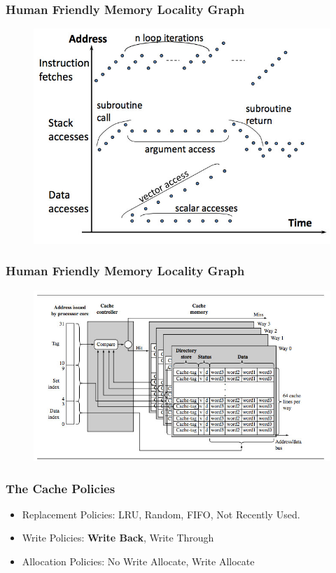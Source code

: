 \documentclass{beamer}
\begin{document}

\begin{frame}[plain]
	\frametitle{Human Friendly Memory Locality Graph}
		\begin{figure}
			\includegraphics[width=0.9\linewidth]{img/localitygraph2.jpg}
		\end{figure}
\end{frame}


\begin{frame}[plain]
	\frametitle{Human Friendly Memory Locality Graph}
		\begin{figure}
			\includegraphics[width=1\linewidth]{img/cacheinternals.jpg}
		\end{figure}
\end{frame}


\begin{frame}
	\frametitle{The Cache Policies}
	\begin{itemize}
		\item Replacement Policies: LRU, Random, FIFO, Not Recently Used. 
		\item Write Policies: \textbf{Write Back}, Write Through
		\item Allocation Policies: No Write Allocate, Write Allocate
	\end{itemize}

\end{frame}
\end{document}
